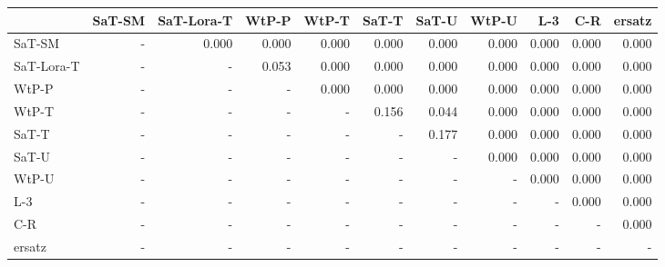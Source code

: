 \begin{tabular}{lrrrrrrrrrr}
\toprule
 & SaT-SM & SaT-Lora-T & WtP-P & WtP-T & SaT-T & SaT-U & WtP-U & L-3 & C-R & ersatz \\
\midrule
SaT-SM & - & 0.000 & 0.000 & 0.000 & 0.000 & 0.000 & 0.000 & 0.000 & 0.000 & 0.000 \\
SaT-Lora-T & - & - & 0.053 & 0.000 & 0.000 & 0.000 & 0.000 & 0.000 & 0.000 & 0.000 \\
WtP-P & - & - & - & 0.000 & 0.000 & 0.000 & 0.000 & 0.000 & 0.000 & 0.000 \\
WtP-T & - & - & - & - & 0.156 & 0.044 & 0.000 & 0.000 & 0.000 & 0.000 \\
SaT-T & - & - & - & - & - & 0.177 & 0.000 & 0.000 & 0.000 & 0.000 \\
SaT-U & - & - & - & - & - & - & 0.000 & 0.000 & 0.000 & 0.000 \\
WtP-U & - & - & - & - & - & - & - & 0.000 & 0.000 & 0.000 \\
L-3 & - & - & - & - & - & - & - & - & 0.000 & 0.000 \\
C-R & - & - & - & - & - & - & - & - & - & 0.000 \\
ersatz & - & - & - & - & - & - & - & - & - & - \\
\bottomrule
\end{tabular}

